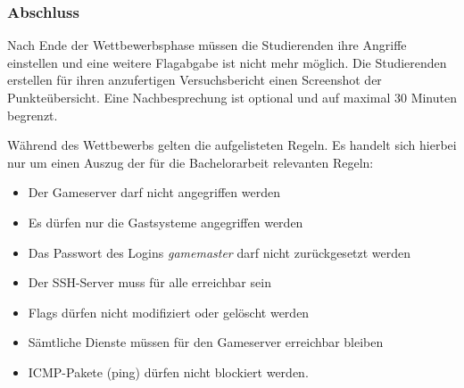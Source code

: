 \subsubsection{Abschluss}
Nach Ende der Wettbewerbsphase müssen die Studierenden ihre Angriffe einstellen und eine weitere Flagabgabe ist nicht mehr möglich. Die Studierenden erstellen für ihren anzufertigen Versuchsbericht einen Screenshot der Punkteübersicht. Eine Nachbesprechung ist optional und auf maximal 30 Minuten begrenzt.

Während des Wettbewerbs gelten die aufgelisteten Regeln. Es handelt sich hierbei nur um einen Auszug der für die Bachelorarbeit relevanten Regeln:
\begin{itemize}
\item Der Gameserver darf nicht angegriffen werden
\item Es dürfen nur die Gastsysteme angegriffen werden
\item Das Passwort des Logins \textit{gamemaster} darf nicht zurückgesetzt werden
\item Der SSH-Server muss für alle erreichbar sein
\item Flags dürfen nicht modifiziert oder gelöscht werden
\item Sämtliche Dienste müssen für den Gameserver erreichbar bleiben
\item ICMP-Pakete (ping) dürfen nicht blockiert werden.
\end{itemize} \cite[S.9]{quadePraktikumITSecurity2017} \cite[S.10-11]{sosnaKonzeptionUndRealisierung2010}